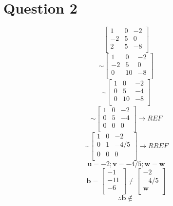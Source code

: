 \documentclass{report}
\begin{document}
\section*{Question 2}
\begin{equation}
\begin{bmatrix}
1 & 0 & -2 \\ 
-2 & 5 & 0 \\ 
2 & 5 & -8 \\ 
\end{bmatrix}
\end{equation}
\begin{equation}
\sim
\begin{bmatrix}
1 & 0 & -2 \\ 
-2 & 5 & 0 \\ 
0 & 10 & -8 \\ 
\end{bmatrix}
\end{equation}
\begin{equation}
\sim
\begin{bmatrix}
1 & 0 & -2 \\ 
0 & 5 & -4 \\ 
0 & 10 & -8 \\ 
\end{bmatrix}
\end{equation}
\begin{equation}
\sim
\begin{bmatrix}
1 & 0 & -2 \\ 
0 & 5 & -4 \\ 
0 & 0 & 0 \\ 
\end{bmatrix}
\rightarrow
REF
\end{equation}
\begin{equation}
\sim
\begin{bmatrix}
1 & 0 & -2 \\ 
0 & 1 & -4/5 \\ 
0 & 0 & 0 \\ 
\end{bmatrix}
\rightarrow
RREF
\end{equation}
\begin{equation*}
\textbf{u}
=-2;
\textbf{v}
=-4/5;
\textbf{w}
=
\textbf{w}
\end{equation*}
\begin{equation}
\textbf{b}
=
\begin{bmatrix}
-1 \\ 
-11 \\ 
-6 \\ 
\end{bmatrix}
\neq
\begin{bmatrix}
-2 \\ 
-4/5 \\ 
\textbf{w} \\ 
\end{bmatrix}
\end{equation}
\begin{equation}
\therefore
\textbf{b}
\notin
\end{equation}
\end{document}
